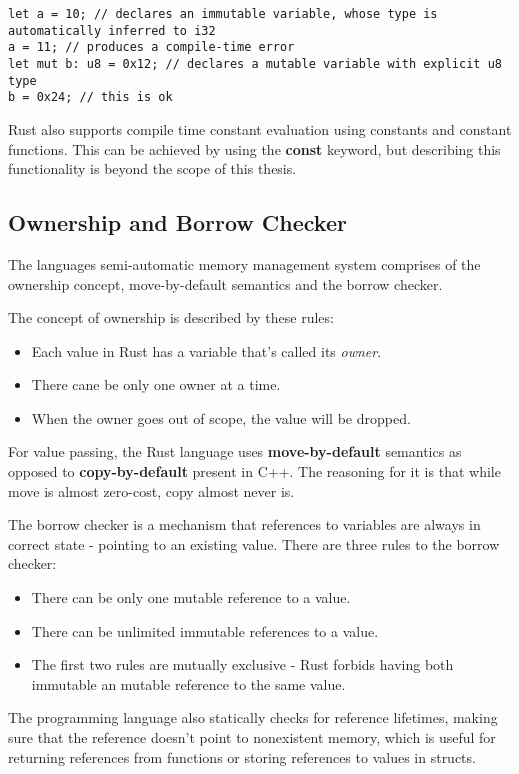 \begin{lstlisting}
let a = 10; // declares an immutable variable, whose type is automatically inferred to i32
a = 11; // produces a compile-time error
let mut b: u8 = 0x12; // declares a mutable variable with explicit u8 type
b = 0x24; // this is ok
\end{lstlisting}

Rust also supports compile time constant evaluation using constants and constant functions.
This can be achieved by using the \textbf{const} keyword, but describing this functionality is beyond the scope of this thesis.

\subsection{Ownership and Borrow Checker}
\label{subsec:borrow}
The languages semi-automatic memory management system comprises of the ownership concept, move-by-default semantics and the borrow checker.

The concept of ownership is described by these rules\cite{klabnik_rust_nodate}:
\begin{itemize}
    \item Each value in Rust has a variable that's called its \textit{owner}.
    \item There cane be only one owner at a time.
    \item When the owner goes out of scope, the value will be dropped.
\end{itemize}
For value passing, the Rust language uses \textbf{move-by-default} semantics as opposed to \textbf{copy-by-default} present in C++.
The reasoning for it is that while move is almost zero-cost, copy almost never is.

The borrow checker is a mechanism that references to variables are always in correct state - pointing to an existing value.
There are three rules to the borrow checker:
\begin{itemize}
    \item There can be only one mutable reference to a value.
    \item There can be unlimited immutable references to a value.
    \item The first two rules are mutually exclusive - Rust forbids having both immutable an mutable reference to the same value.
\end{itemize}

The programming language also statically checks for reference lifetimes, making sure that the reference doesn't point to nonexistent memory, which is useful for returning references from functions or storing references to values in structs.

